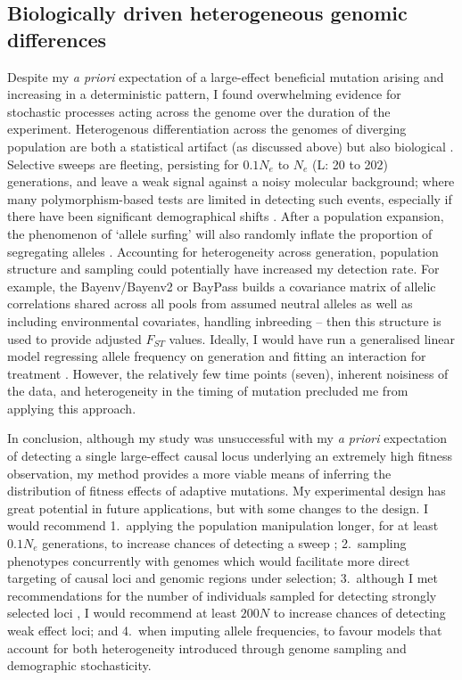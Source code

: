 \subsection{Biologically driven heterogeneous genomic differences}
Despite my \textit{a priori} expectation of a large-effect beneficial mutation arising and increasing in a deterministic pattern, I found overwhelming evidence for stochastic processes acting across the genome over the duration of the experiment. Heterogenous differentiation across the genomes of diverging population are both a statistical artifact (as discussed above) but also biological \citep{Seme19}. Selective sweeps are fleeting, persisting for $0.1N_e$ to $N_e$ (L: 20 to 202) generations, and leave a weak signal against a noisy molecular background; where many polymorphism-based tests are limited in detecting such events, especially if there have been significant demographical shifts \citep{Wals18c9}. After a population expansion, the phenomenon of ‘allele surfing’ will also randomly inflate the proportion of segregating alleles \citep{Wals18c9}. Accounting for heterogeneity across generation, population structure and sampling could potentially have increased my detection rate. For example, the Bayenv/Bayenv2 \citep{Coop10, Gunt13} or BayPass \citep{Gaut15} builds a covariance matrix of allelic correlations shared across all pools from assumed neutral alleles as well as including environmental covariates, handling inbreeding – then this structure is used to provide adjusted $F_{ST}$ values. Ideally, I would have run a generalised linear model regressing allele frequency on generation and fitting an interaction for treatment \citep{Vlac19}. However, the relatively few time points (seven), inherent noisiness of the data, and heterogeneity in the timing of mutation precluded me from applying this approach. \par

In conclusion, although my study was unsuccessful with my \textit{a priori} expectation of detecting a single large-effect causal locus underlying an extremely high fitness observation, my method provides a more viable means of inferring the distribution of fitness effects of adaptive mutations. My experimental design has great potential in future applications, but with some changes to the design. I would recommend 1.~applying the population manipulation longer, for at least $0.1N_e$ generations, to increase chances of detecting a sweep \citep{Wals18c9}; 2.~sampling phenotypes concurrently with genomes which would facilitate more direct targeting of causal loci and genomic regions under selection; 3.~although I met recommendations for the number of individuals sampled for detecting strongly selected loci \citep[$50N$][]{Schl15}, I would recommend at least $200N$ to increase chances of detecting weak effect loci; and 4.~when imputing allele frequencies, to favour models that account for both heterogeneity introduced through genome sampling and demographic stochasticity. \par


